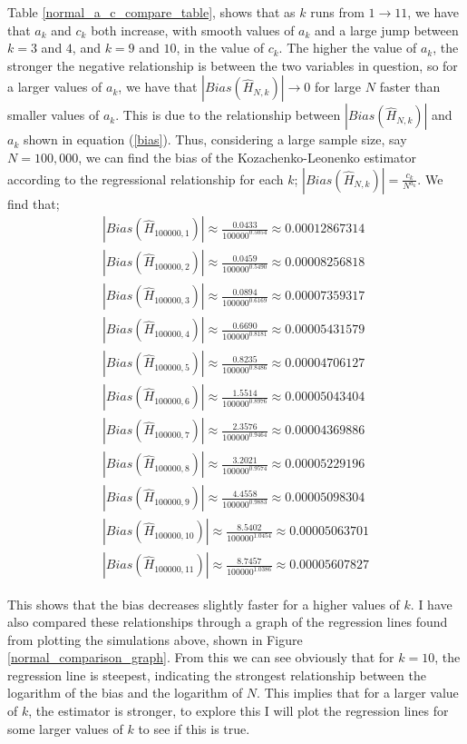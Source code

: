 \documentclass{article}
\begin{document}
Table \ref{normal_a_c_compare_table}, shows that as $k$ runs from $1 \to 11$, we have that $a_{k}$ and $c_{k}$ both increase, with smooth values of $a_{k}$ and a large jump between $k=3$ and $4$, and $k=9$ and $10$, in the value of $c_{k}$. The higher the value of $a_{k}$, the stronger the negative relationship is between the two variables in question, so for a larger values of $a_{k}$, we have that $|Bias(\hat{H}_{N, k})| \to 0$ for large $N$ faster than smaller values of $a_{k}$. This is due to the relationship between $|Bias(\hat{H}_{N, k})|$ and $a_{k}$ shown in equation (\ref{bias}). Thus, considering a large sample size, say $N=100,000$, we can find the bias of the Kozachenko-Leonenko estimator according to the regressional relationship for each $k$; $|Bias(\hat{H}_{N, k})| = \frac{c_{k}}{N^{a_{k}}}$. We find that;
\begin{gather*}
|Bias(\hat{H}_{100000, 1})| \approx  \frac{0.0433}{100000^{0.5054}}   \approx  0.00012867314\\
|Bias(\hat{H}_{100000, 2})| \approx  \frac{0.0459}{100000^{0.5490}}   \approx  0.00008256818\\
|Bias(\hat{H}_{100000, 3})| \approx  \frac{0.0894}{100000^{0.6169}}   \approx  0.00007359317\\
|Bias(\hat{H}_{100000, 4})| \approx  \frac{0.6690}{100000^{0.8181}}   \approx  0.00005431579\\
|Bias(\hat{H}_{100000, 5})| \approx  \frac{0.8235}{100000^{0.8486}}   \approx  0.00004706127\\
|Bias(\hat{H}_{100000, 6})| \approx  \frac{1.5514}{100000^{0.8976}}   \approx  0.00005043404 \\
|Bias(\hat{H}_{100000, 7})| \approx  \frac{2.3576}{100000^{0.9464}}   \approx  0.00004369886\\
|Bias(\hat{H}_{100000, 8})| \approx  \frac{3.2021}{100000^{0.9574}}   \approx  0.00005229196\\
|Bias(\hat{H}_{100000, 9})| \approx  \frac{4.4558}{100000^{0.9883}}   \approx  0.00005098304\\
|Bias(\hat{H}_{100000, 10})| \approx  \frac{8.5402}{100000^{1.0454}}   \approx  0.00005063701 \\
|Bias(\hat{H}_{100000, 11})| \approx  \frac{8.7457}{100000^{1.0386}}   \approx 0.00005607827
\end{gather*}


This shows that the bias decreases slightly faster for a higher values of $k$. I have also compared these relationships through a graph of the regression lines found from plotting the simulations above, shown in Figure \ref{normal_comparison_graph}. From this we can see obviously that for $k=10$, the regression line is steepest, indicating the strongest relationship between the logarithm of the bias and the logarithm of $N$. This implies that for a larger value of $k$, the estimator is stronger, to explore this I will plot the regression lines for some larger values of $k$ to see if this is true.
\end{document}
